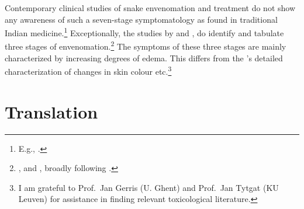 Contemporary clinical studies of snake envenomation and treatment do
not show any awareness of such a seven-stage symptomatology as found
in traditional Indian medicine.\footnote{E.g., \cites {elle-1997}
    {wein-2009} [1747--1749]{pill-2013} [19]{who-2019} {meht-2002}
    {hamz-2021} {desh-2022}.} Exceptionally, the studies by
    \citeauthor{barc-2008} and \citeauthor{oezb-2021}, do identify and
    tabulate three stages of envenomation.\footnote{\cite[1017, Table
        176.3]{barc-2008}, and \cite[7, and Table 1]{oezb-2021}, broadly
        following \citeauthor{barc-2008}.}  The symptoms of these three
        stages are mainly characterized by increasing degrees of edema.  This
        differs from the \SS's detailed characterization of changes in skin
        colour etc.\footnote{I am grateful to Prof.\ Jan Gerris (U. Ghent)
            and Prof.\ Jan Tytgat (KU Leuven) for assistance in finding relevant
            toxicological literature.}


\section{Translation}

